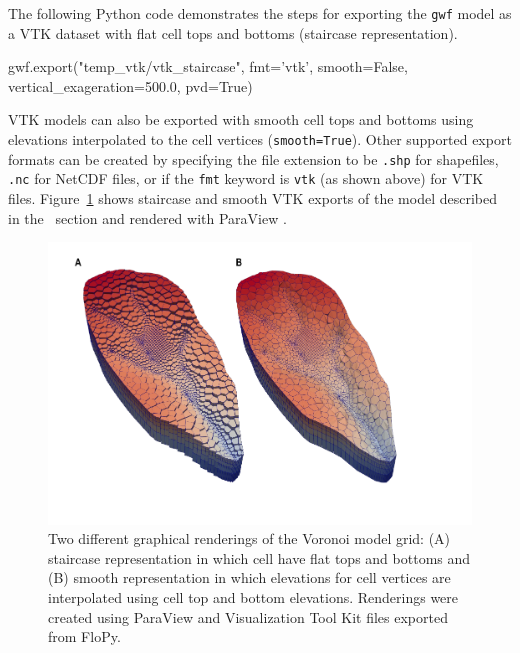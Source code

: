 \documentclass[12pt, oneside]{article}  	%
\begin{document}
The following Python code demonstrates the steps for exporting the \texttt{gwf} model as a VTK dataset with flat cell tops and bottoms (staircase representation).

\begin{python}
gwf.export("temp_vtk/vtk_staircase", fmt='vtk', smooth=False,
           vertical_exageration=500.0, pvd=True)
\end{python}

\noindent VTK models can also be exported with smooth cell tops and bottoms using elevations interpolated to the cell vertices (\texttt{smooth=True}). Other supported export formats can be created by specifying the file extension to be \texttt{.shp} for shapefiles, \texttt{.nc} for NetCDF files, or if the \texttt{fmt} keyword is \texttt{vtk} (as shown above) for VTK files. Figure~\ref{fig:flopyvtk} shows staircase and smooth VTK exports of the model described in the~ section and rendered with ParaView \citep{ahrens2005paraview}.

\begin{figure}[ht!]
	\begin{center}
		\includegraphics{figure4.pdf}
	\end{center}
	\caption{Two different graphical renderings of the Voronoi model grid: (A) staircase representation in which cell have flat tops and bottoms and (B) smooth representation in which elevations for cell vertices are interpolated using cell top and bottom elevations. Renderings were created using ParaView \citep{ahrens2005paraview} and Visualization Tool Kit \citep{schroeder:2006:VTK} files exported from FloPy.}
	\label{fig:flopyvtk}
\end{figure}
\end{document}
